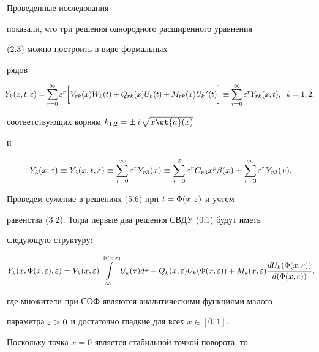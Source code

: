 Проведенные исследования


показали, что три решения однородного расширенного уравнения


(2.3) можно построить в виде формальных


рядов


\begin{equation}


\negthickspace


Y_k (x, t, \e) = \sum \limits_{r=0}^{\infty} \e^r \biggl[ V_{rk}


(x) W_k (t) + Q_{rk} (x) U_k (t) + M_{rk} (x) U_k\,' (t) \biggr]


\equiv \sum \limits_{r=0}^{\infty} \e^r Y_{rk} (x,t), \ \; k=1,2,


\end{equation}


соответствующих корням $k_{1, 2} = \pm \,i\,\sqrt{x\wt{a} (x)}$


и


\begin{equation}


Y_3 (x, \e) \equiv Y_3 (x, t, \e) \equiv \sum_{r=0}^{\infty} \e^r Y_{r3} (x)


\equiv \sum \limits_{r=0}^{2} \e^r C_{r3} x^{\rho} \beta (x) +


\sum \limits_{r=3}^{\infty} \e^r Y_{r3} (x). 


\end{equation}





Проведем сужение в решениях (5.6) при $t = \Phi(x, \varepsilon)$ и учтем


равенства (3.2). Тогда первые два решения СВДУ (0.1) будут иметь


следующую структуру:


$$


Y_k (x, \Phi(x, \e), \e) = V_{k} (x, \e) \int


\limits_{\infty}^{\Phi(x, \e)} U_k (\tau) d \tau + Q_k (x, \e)


U_k (\Phi(x, \e)) + M_k (x, \e) \frac{d U_k (\Phi(x, \e))}{d


(\Phi(x, \e))},


$$


где множители при СОФ являются аналитическими функциями малого


параметра $\varepsilon >0$ и достаточно гладкие для всех $x \in [0,1]$.


Поскольку точка $x=0$ является стабильной точкой поворота, то


